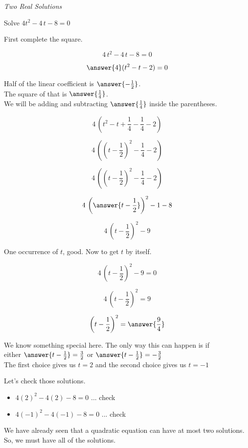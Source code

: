 \documentclass{ximera}
\begin{document}
\begin{example} \textit{Two Real Solutions}

Solve $4  t^2 - 4 \, t - 8 = 0$ \\


\begin{explanation}

First complete the square.



\[ 4 \, t^2 -  4 \, t - 8 = 0 \]

\[ \answer{4} (t^2 - t - 2) = 0 \]



Half of the linear coefficient is $\answer{-\frac{1}{2}}$. \\

The square of that is $\answer{\frac{1}{4}}$. \\

We will be adding and subtracting $\answer{\frac{1}{4}}$ inside the parentheses.




\[ 4 \, (t^2 - t + \frac{1}{4} - \frac{1}{4} - 2)  \]


\[ 4 \, \left(\left(t - \frac{1}{2}\right)^2 - \frac{1}{4} - 2\right)  \]


\[ 4 \, \left(\left(t - \frac{1}{2}\right)^2 - \frac{1}{4} - 2\right)  \]

\[ 4 \, \left( \answer{t - \frac{1}{2}} \right)^2 - 1 - 8  \]

\[ 4 \, \left(t - \frac{1}{2}\right)^2 - 9  \]


One occurrence of $t$, good. Now to get $t$ by itself.

\[ 4 \, \left(t - \frac{1}{2}\right)^2 - 9 = 0  \]

\[ 4 \, \left(t - \frac{1}{2}\right)^2 = 9  \]

\[  \left(t - \frac{1}{2}\right)^2 = \answer{\frac{9}{4}}  \]

We know something special here. The only way this can happen is if \\



either   $\answer{t - \frac{1}{2}} = \frac{3}{2}$  or  $\answer{t - \frac{1}{2}} = -\frac{3}{2}$ \\

The first choice gives us $t = 2$ and the second choice gives us $t = -1$




Let's check those solutions.

\begin{itemize}
\item $4 (2)^2 - 4 (2) - 8 = 0$ ... check
\item $4 (-1)^2 - 4 (-1) - 8 = 0$ ... check
\end{itemize}



We have already seen that a quadratic equation can have at most two solutions.  So, we must have all of the solutions.

\end{explanation}


\end{example}
\end{document}
